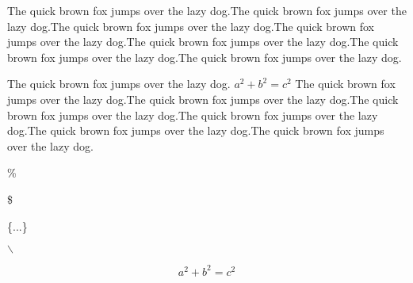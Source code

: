 \documentclass{article} %
\begin{document}
The quick brown fox jumps over the lazy dog.The quick brown fox jumps over the lazy dog.The quick brown fox jumps over the lazy dog.The quick brown fox jumps over the lazy dog.The quick brown fox jumps over the lazy dog.The quick brown fox jumps over the lazy dog.The quick brown fox jumps over the lazy dog.

The quick brown fox jumps over the lazy dog. $a^2+b^2=c^2$ The quick brown fox jumps over the lazy dog.The quick brown fox jumps over the lazy dog.The quick brown fox jumps over the lazy dog.The quick brown fox jumps over the lazy dog.The quick brown fox jumps over the lazy dog.The quick brown fox jumps over the lazy dog.

\% %

\$ %

\{...\}  %

$\backslash$    %

$$a^2+b^2=c^2$$ %
\end{document}
